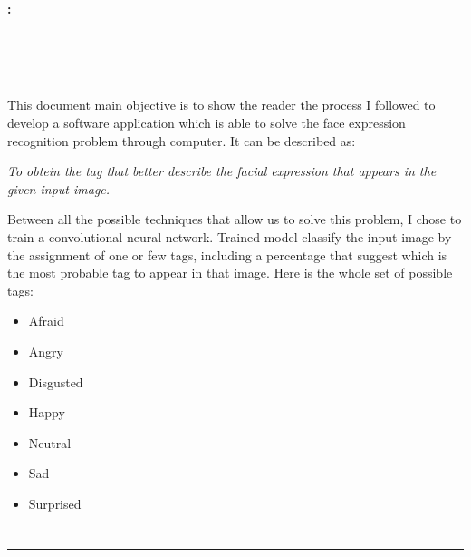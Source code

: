 \cleardoublepage


\thispagestyle{empty}


\begin{center}
{\large\bfseries \myTitleEN: \mySubtitleEN}\\
\end{center}
\begin{center}
\myName\\
\end{center}

\\

\vspace{0.7cm}
\\

This document main objective is to show the reader the process I followed to develop a software application which is able to solve the face expression recognition problem through computer. It can be described as:\\
\begin{center}
	\textit{To obtein the tag that better describe the facial expression that appears in the given input image.}
\end{center}
Between all the possible techniques that allow us to solve this problem, I chose to train a convolutional neural network. Trained model classify the input image by the assignment of one or few tags, including a percentage that suggest which is the most probable tag to appear in that image. Here is the whole set of possible tags:
\begin{multicols}{2}
	\begin{itemize}
		\item Afraid
		\item Angry
		\item Disgusted
		\item Happy
		\item Neutral
		\item Sad
		\item Surprised
	\end{itemize}
\end{multicols}

\chapter*{}
\thispagestyle{empty}

\noindent\rule[-1ex]{\textwidth}{2pt}\\[4.5ex]

